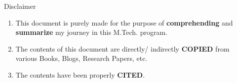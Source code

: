 \thispagestyle{empty}

















\begin{center}
    \Huge Disclaimer
    \vspace{0.5cm}
\end{center}

\begin{enumerate}
    \item This document is purely made for the purpose of \textbf{comprehending} and \textbf{summarize} my journey in this M.Tech. program.

    \item The contents of this document are directly/ indirectly \textbf{COPIED} from various Books, Blogs, Research Papers, etc.

    \item The contents have been properly \textbf{CITED}.
\end{enumerate}


\restoregeometry

